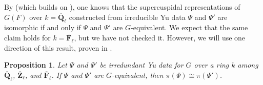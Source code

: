 \documentclass[reqno]{amsart}
\numberwithin{equation}{subsection}
\DeclareRobustCommand{\sean}[1]{{\color{red}\sffamily $\heartsuit\heartsuit\heartsuit$ SEAN: [#1]}}
\DeclareRobustCommand{\response}[1]{{\color{Purple}\sffamily RESPONSE: [#1]}}
\newcommand{\F}{\mathbf{F}}
\newcommand{\Q}{\mathbf{Q}}
\newcommand{\Z}{\mathbf{Z}}
\newcommand{\ol}[1]{\overline{#1}}
\newtheorem{prop}[thm]{Proposition}
\theoremstyle{remark}
\numberwithin{equation}{subsection}
\numberwithin{figure}{subsection}
\begin{document}
By \cite[Corollary 3.5.5]{Kal19} (which builds on \cite[Theorem 6.6]{HM08}), one knows that the supercuspidal representations of $G(F)$ over $k = \ol\Q_\ell$ constructed from irreducible Yu data $\Psi$ and $\Psi'$ are isomorphic if and only if $\Psi$ and $\Psi'$ are $G$-equivalent. We expect that the same claim holds for $k = \ol\F_\ell$, but we have not checked it. However, we will use one direction of this result, proven in \cite[Proposition 4.24]{HM08}. %

\begin{prop}\label{prop:hakim-murnaghan-4.24}
Let $\Psi$ and $\Psi'$ be irredundant Yu data for $G$ over a ring $k$ among $\ol\Q_\ell$, $\ol\Z_\ell$, and $\ol\F_\ell$. If $\Psi$ and $\Psi'$ are $G$-equivalent, then $\pi(\Psi) \cong \pi(\Psi')$.
\end{prop}
\end{document}
